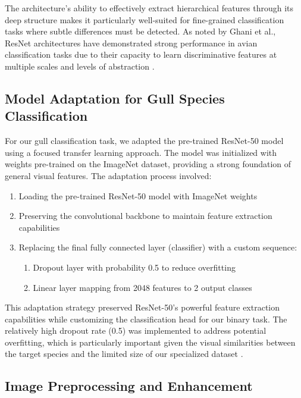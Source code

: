 \documentclass[a4paper,12pt]{article}
\begin{document}
The architecture's ability to effectively extract hierarchical features through its deep structure makes it particularly well-suited for fine-grained classification tasks where subtle differences must be detected. As noted by Ghani et al., ResNet architectures have demonstrated strong performance in avian classification tasks due to their capacity to learn discriminative features at multiple scales and levels of abstraction \citep{ghani2024comprehensive}.

\subsection{Model Adaptation for Gull Species Classification}

For our gull classification task, we adapted the pre-trained ResNet-50 model using a focused transfer learning approach. The model was initialized with weights pre-trained on the ImageNet dataset, providing a strong foundation of general visual features. The adaptation process involved:

\begin{enumerate}
    \item Loading the pre-trained ResNet-50 model with ImageNet weights
    \item Preserving the convolutional backbone to maintain feature extraction capabilities
    \item Replacing the final fully connected layer (classifier) with a custom sequence:
    \begin{enumerate}
        \item Dropout layer with probability 0.5 to reduce overfitting
        \item Linear layer mapping from 2048 features to 2 output classes
    \end{enumerate}
\end{enumerate}

This adaptation strategy preserved ResNet-50's powerful feature extraction capabilities while customizing the classification head for our binary task. The relatively high dropout rate (0.5) was implemented to address potential overfitting, which is particularly important given the visual similarities between the target species and the limited size of our specialized dataset \citep{srivastava2014dropout}.

\subsection{Image Preprocessing and Enhancement}
\end{document}
